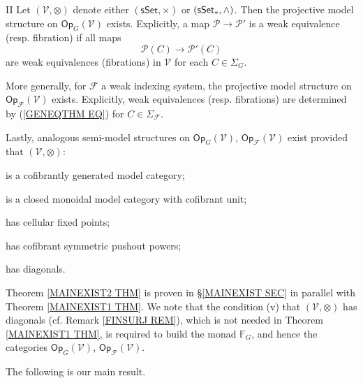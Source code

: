 \documentclass[a4paper,10pt]{article}%
\begin{document}
\begin{customthm}{II}\label{MAINEXIST2 THM}
Let $(\mathcal{V},\otimes)$
denote either 
$(\mathsf{sSet}, \times)$
or
$(\mathsf{sSet}_{\**}, \wedge)$.
Then the projective model structure on 
$\mathsf{Op}_G(\mathcal{V})$ exists. Explicitly,
a map $\mathcal{P} \to \mathcal{P}'$ is a weak equivalence (resp. fibration) if all maps
\begin{equation}\label{GENEQTHM EQ}
\mathcal{P}(C)
	\to
\mathcal{P}'(C)
\end{equation}
are weak equivalences (fibrations) in $\mathcal{V}$
for each $C \in \Sigma_G$.

More generally, for $\mathcal{F}$ a weak indexing system, the projective model structure on 
$\mathsf{Op}_{\mathcal{F}}(\mathcal{V})$ exists. Explicitly, weak equivalences (resp. fibrations) are
determined by (\ref{GENEQTHM EQ})
for $C \in \Sigma_{\mathcal{F}}$.

Lastly, 
analogous 
semi-model structures on
$\mathsf{Op}_G(\mathcal{V})$,
$\mathsf{Op}_{\mathcal{F}}(\mathcal{V})$
exist
provided that
$(\mathcal{V},\otimes)$:
\begin{inparaenum}
\item[(i)] is a cofibrantly generated model category;
\item [(ii)] is a closed monoidal model category with cofibrant unit;
\item[(iii)] has cellular fixed points;
\item[(iv)] has cofibrant symmetric pushout powers;
\item[(v)] has diagonals.
\end{inparaenum}
\end{customthm}

Theorem \ref{MAINEXIST2 THM} is proven in 
\S \ref{MAINEXIST SEC}
in parallel with Theorem \ref{MAINEXIST1 THM}.
We note that the condition (v) that 
$(\mathcal{V},\otimes)$ has diagonals (cf. Remark \ref{FINSURJ REM}), which is not needed in 
Theorem \ref{MAINEXIST1 THM}, is required to build
the monad $\mathbb F_G$, and hence the categories
$\mathsf{Op}_G(\mathcal{V})$,
$\mathsf{Op}_{\mathcal{F}}(\mathcal{V})$.

The following is our main result.
\end{document}
